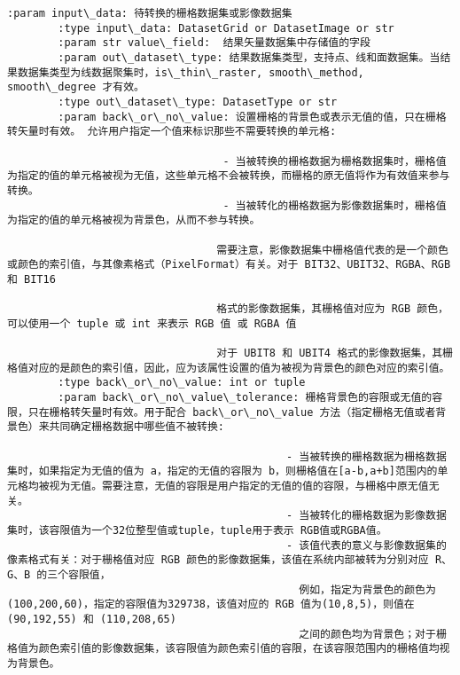 \documentclass[11pt]{article}
\begin{document}
\begin{Verbatim}[commandchars=\\\{\}]
        :param input\_data: 待转换的栅格数据集或影像数据集
        :type input\_data: DatasetGrid or DatasetImage or str
        :param str value\_field:  结果矢量数据集中存储值的字段
        :param out\_dataset\_type: 结果数据集类型，支持点、线和面数据集。当结果数据集类型为线数据聚集时，is\_thin\_raster, smooth\_method, smooth\_degree 才有效。
        :type out\_dataset\_type: DatasetType or str
        :param back\_or\_no\_value: 设置栅格的背景色或表示无值的值，只在栅格转矢量时有效。 允许用户指定一个值来标识那些不需要转换的单元格:
        
                                  - 当被转换的栅格数据为栅格数据集时，栅格值为指定的值的单元格被视为无值，这些单元格不会被转换，而栅格的原无值将作为有效值来参与转换。
                                  - 当被转化的栅格数据为影像数据集时，栅格值为指定的值的单元格被视为背景色，从而不参与转换。
        
                                 需要注意，影像数据集中栅格值代表的是一个颜色或颜色的索引值，与其像素格式（PixelFormat）有关。对于 BIT32、UBIT32、RGBA、RGB 和 BIT16
        
                                 格式的影像数据集，其栅格值对应为 RGB 颜色，可以使用一个 tuple 或 int 来表示 RGB 值 或 RGBA 值
        
                                 对于 UBIT8 和 UBIT4 格式的影像数据集，其栅格值对应的是颜色的索引值，因此，应为该属性设置的值为被视为背景色的颜色对应的索引值。
        :type back\_or\_no\_value: int or tuple
        :param back\_or\_no\_value\_tolerance: 栅格背景色的容限或无值的容限，只在栅格转矢量时有效。用于配合 back\_or\_no\_value 方法（指定栅格无值或者背景色）来共同确定栅格数据中哪些值不被转换:
        
                                            - 当被转换的栅格数据为栅格数据集时，如果指定为无值的值为 a，指定的无值的容限为 b，则栅格值在[a-b,a+b]范围内的单元格均被视为无值。需要注意，无值的容限是用户指定的无值的值的容限，与栅格中原无值无关。
                                            - 当被转化的栅格数据为影像数据集时，该容限值为一个32位整型值或tuple，tuple用于表示 RGB值或RGBA值。
                                            - 该值代表的意义与影像数据集的像素格式有关：对于栅格值对应 RGB 颜色的影像数据集，该值在系统内部被转为分别对应 R、G、B 的三个容限值，
                                              例如，指定为背景色的颜色为(100,200,60)，指定的容限值为329738，该值对应的 RGB 值为(10,8,5)，则值在 (90,192,55) 和 (110,208,65)
                                              之间的颜色均为背景色；对于栅格值为颜色索引值的影像数据集，该容限值为颜色索引值的容限，在该容限范围内的栅格值均视为背景色。
        

\end{Verbatim}
\end{document}
